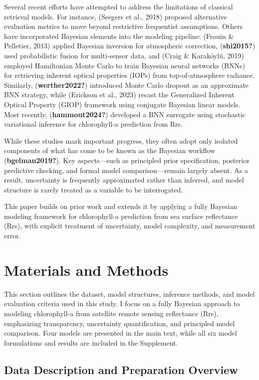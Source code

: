 \documentclass[
]{agujournal2019}
\begin{document}
Several recent efforts have attempted to address the limitations of
classical retrieval models. For instance, (Seegers et al., 2018)
proposed alternative evaluation metrics to move beyond restrictive
frequentist assumptions. Others have incorporated Bayesian elements into
the modeling pipeline: (Frouin \& Pelletier, 2013) applied Bayesian
inversion for atmospheric correction, (\textbf{shi2015?}) used
probabilistic fusion for multi-sensor data, and (Craig \& Karaköylü,
2019) employed Hamiltonian Monte Carlo to train Bayesian neural networks
(BNNs) for retrieving inherent optical properties (IOPs) from
top-of-atmosphere radiance. Similarly, (\textbf{werther2022?})
introduced Monte Carlo dropout as an approximate BNN strategy, while
(Erickson et al., 2023) recast the Generalized Inherent Optical Property
(GIOP) framework using conjugate Bayesian linear models. Most recently,
(\textbf{hammout2024?}) developed a BNN surrogate using stochastic
variational inference for chlorophyll-a prediction from Rrs.

While these studies mark important progress, they often adopt only
isolated components of what has come to be known as the Bayesian
workflow (\textbf{bgelman2019?}). Key aspects---such as principled prior
specification, posterior predictive checking, and formal model
comparison---remain largely absent. As a result, uncertainty is
frequently approximated rather than inferred, and model structure is
rarely treated as a variable to be interrogated.

This paper builds on prior work and extends it by applying a fully
Bayesian modeling framework for chlorophyll-a prediction from sea
surface reflectance (Rrs), with explicit treatment of uncertainty, model
complexity, and measurement error.

\section{Materials and Methods}\label{materials-and-methods}

This section outlines the dataset, model structures, inference methods,
and model evaluation criteria used in this study. I focus on a fully
Bayesian approach to modeling chlorophyll-a from satellite remote
sensing reflectance (Rrs), emphasizing transparency, uncertainty
quantification, and principled model comparison. Four models are
presented in the main text, while all six model formulations and results
are included in the Supplement.

\subsection{Data Description and Preparation
Overview}\label{data-description-and-preparation-overview}
\end{document}
